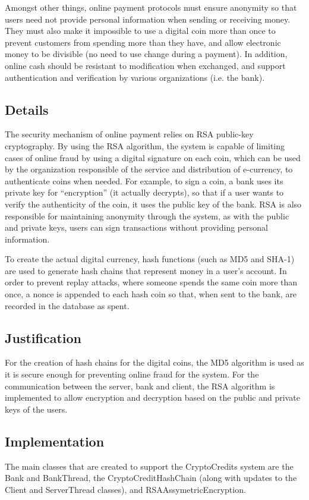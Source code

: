 \documentclass[a4paper,11pt]{article}
\begin{document}
Amongst other things, online payment protocols must ensure anonymity so that 
users need not provide personal information when sending or receiving money. 
They must also make it impossible to use a digital coin more than once to 
prevent customers from spending more than they have, and allow electronic money 
to be divisible (no need to use change during a payment). In addition, online 
cash should be resistant to modification when exchanged, and support 
authentication and verification by various organizations (i.e. the bank).

\subsection{Details}
The security mechanism of online payment relies on RSA public-key cryptography. 
By using the RSA algorithm, the system is capable of limiting cases of online 
fraud by using a digital signature on each coin, which can be used by the 
organization responsible of the service and distribution of e-currency, to 
authenticate coins when needed. For example, to sign a coin, a bank uses its 
private key for “encryption” (it actually decrypts), so that if a user wants to 
verify the authenticity of the coin, it uses the public key of the bank. RSA is 
also responsible for maintaining anonymity through the system, as with the 
public and private keys, users can sign transactions without providing personal 
information.

To create the actual digital currency, hash functions (such as MD5 and SHA-1) 
are used to generate hash chains that represent money in a user’s account. In 
order to prevent replay attacks, where someone spends the same coin more than 
once, a nonce is appended to each hash coin so that, when sent to the bank, are 
recorded in the database as spent.

\subsection{Justification}
For the creation of hash chains for the digital coins, the MD5 algorithm is used
as it is secure enough for preventing online fraud for the system. For the 
communication between the server, bank and client, the RSA algorithm is 
implemented to allow encryption and decryption based on the public and private 
keys of the users.

\subsection{Implementation}
The main classes that are created to support the CryptoCredits system are the 
Bank and BankThread, the CryptoCreditHashChain (along with updates to the Client
and ServerThread classes), and RSAAssymetricEncryption.
\end{document}
